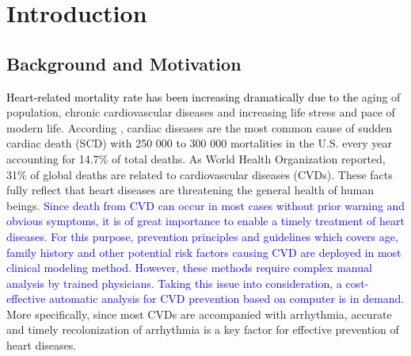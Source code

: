  \chapter{Introduction}

 \section{Background and Motivation}
 
\textcolor{black}{Heart-related mortality rate has been increasing dramatically due to the} aging of population, chronic cardiovascular diseases and increasing life stress and pace of modern life\cite{mortality}. According \cite{SCDnumber}, %
cardiac diseases are the most common cause of sudden cardiac death (SCD) with 250 000 to 300 000 mortalities in the U.S. every year accounting for 14.7\% of total deaths\cite{SCDnumber}. As World Health Organization reported, 31\% of global deaths are related to cardiovascular diseases (CVDs)\cite{who}. %
These facts fully reflect that heart diseases are threatening the general health of human beings. %
\textcolor{blue}{Since death from CVD can occur in most cases without prior warning and obvious symptoms, it is of great importance to enable a timely treatment of heart diseases. For this purpose, prevention principles and guidelines which covers age, family history and other potential risk factors causing CVD are deployed in most clinical modeling method\cite{smith2004principles}. However, these methods require complex manual analysis by trained physicians. Taking this issue into consideration, a cost-effective automatic analysis for CVD prevention based on computer is in demand.}
More specifically, since most CVDs are accompanied with arrhythmia, accurate and timely recolonization of arrhythmia is a key factor for effective prevention of heart diseases. %

